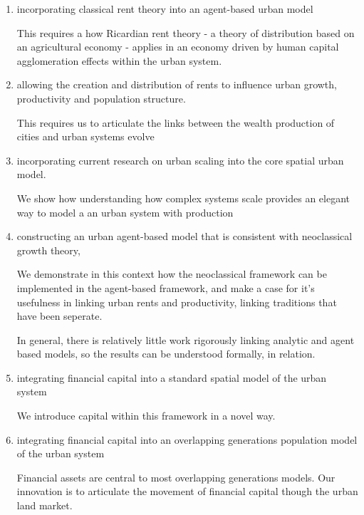 \begin{enumerate}
    \item incorporating \gls{classical rent theory} into an agent-based urban model 

This requires a how Ricardian rent theory - a theory of distribution based on an agricultural economy - applies in an economy driven by human capital agglomeration effects within the urban system. 

    \item allowing the creation and distribution of rents to influence urban growth, productivity and  population structure. 
    
This requires us to articulate the links between the wealth production of cities and  urban systems evolve 

    \item incorporating current research on \gls{urban scaling} into the  core spatial urban model.  

We show how understanding how complex systems scale provides an elegant way to model a an urban system with production

    \item constructing an urban \gls{agent-based model} that is consistent with {neoclassical growth theory},

We demonstrate in this context how %
the neoclassical framework can be implemented in the agent-based framework, and make a case for it's usefulness in linking urban rents and productivity, linking traditions that have been seperate. 

In general, there is relatively little work rigorously linking analytic and agent based models, so the results can be understood formally, in relation. %

    \item integrating \gls{financial capital} into a standard spatial model of the urban system

We introduce capital within this framework in a novel way. %
    
    \item integrating financial capital into an \gls{overlapping generations} population model of the urban system

Financial assets are central to most overlapping generations models. Our innovation is to articulate the movement of financial capital though the urban land market. 


\end{enumerate}
